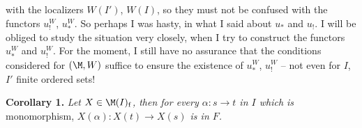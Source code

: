 \noindent{}

\noindent with the localizers $W(I')$, $W(I)$, so they must not be confused with the functors $u_{!}^W$, $u_*^W$. So perhaps I was hasty, in what I said about $u_*$ and $u_{!}$. I will be obliged to study the situation very closely, when I try to construct the functors $u_*^W$ and $u_{!}^W$. For the moment, I still have no assurance that the conditions considered for $(\M,W)$ suffice to ensure the existence of $u_*^W$, $u_{!}^W$ – not even for $I$, $I'$ finite ordered sets!

\textbf{Corollary 1.} \textit{Let $X \in \M(I)_{\mathrm{f}}$, then for every $\alpha : s \longrightarrow t$ in $I$ which is} monomorphism, \textit{$X(\alpha) : X(t) \longrightarrow X(s)$ is in $F$.}

